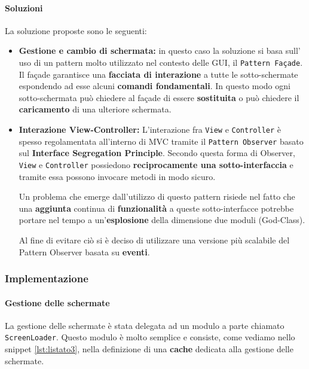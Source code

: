 \paragraph{Soluzioni}
La soluzione proposte sono le seguenti:
\begin{itemize}
 	\item{\textbf{Gestione e cambio di schermata:}} in questo caso la soluzione si basa sull' uso di un pattern molto utilizzato nel contesto delle GUI, il \texttt{Pattern Façade}. Il façade garantisce una \textbf{facciata di interazione} a tutte le sotto-schermate espondendo ad esse alcuni \textbf{comandi fondamentali}. In questo modo ogni sotto-schermata può chiedere al façade di essere \textbf{sostituita} o può chiedere il \textbf{caricamento} di una ulteriore schermata. 
 	\item{\textbf{Interazione View-Controller:}} L'interazione fra \texttt{View} e \texttt{Controller} è spesso regolamentata all'interno di MVC tramite il \texttt{Pattern Observer} basato sul \textbf{Interface Segregation Principle}. Secondo questa forma di Observer, \texttt{View} e  \texttt{Controller} possiedono \textbf{reciprocamente una sotto-interfaccia} e tramite essa possono invocare metodi in modo sicuro.

 	Un problema che emerge dall'utilizzo di questo pattern risiede nel fatto che una \textbf{aggiunta} continua di \textbf{funzionalità} a queste sotto-interfacce potrebbe portare nel tempo a un'\textbf{esplosione} della dimensione due moduli (God-Class).

 	Al fine di evitare ciò si è deciso di utilizzare una versione più scalabile del Pattern Observer basata su \textbf{eventi}.
 \end{itemize}

\subsubsection{Implementazione}
\paragraph{Gestione delle schermate}
La gestione delle schermate è stata delegata ad un modulo a parte chiamato \texttt{ScreenLoader}. Questo modulo è molto semplice e consiste, come vediamo nello snippet \ref{lst:listato3}, nella definizione di una \textbf{cache} dedicata alla gestione delle schermate.




